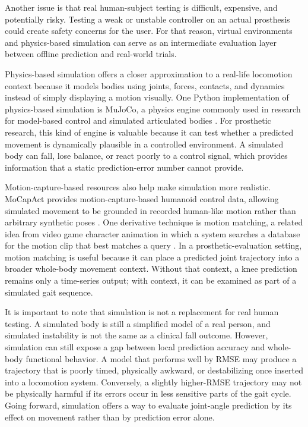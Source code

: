 \documentclass[referee,lineno,pdflatex,sn-vancouver-num]{sn-jnl}
\begin{document}
Another issue is that real human-subject testing is difficult, expensive, and potentially risky. Testing a weak or unstable controller on an actual prosthesis could create safety concerns for the user. For that reason, virtual environments and physics-based simulation can serve as an intermediate evaluation layer between offline prediction and real-world trials.

Physics-based simulation offers a closer approximation to a real-life locomotion context because it models bodies using joints, forces, contacts, and dynamics instead of simply displaying a motion visually. One Python implementation of physics-based simulation is MuJoCo, a physics engine commonly used in research for model-based control and simulated articulated bodies \cite{todorov2012}. For prosthetic research, this kind of engine is valuable because it can test whether a predicted movement is dynamically plausible in a controlled environment. A simulated body can fall, lose balance, or react poorly to a control signal, which provides information that a static prediction-error number cannot provide.

Motion-capture-based resources also help make simulation more realistic. MoCapAct provides motion-capture-based humanoid control data, allowing simulated movement to be grounded in recorded human-like motion rather than arbitrary synthetic poses \cite{wagener2022}. One derivative technique is motion matching, a related idea from video game character animation in which a system searches a database for the motion clip that best matches a query \cite{clavet2016}. In a prosthetic-evaluation setting, motion matching is useful because it can place a predicted joint trajectory into a broader whole-body movement context. Without that context, a knee prediction remains only a time-series output; with context, it can be examined as part of a simulated gait sequence.

It is important to note that simulation is not a replacement for real human testing. A simulated body is still a simplified model of a real person, and simulated instability is not the same as a clinical fall outcome. However, simulation can still expose a gap between local prediction accuracy and whole-body functional behavior. A model that performs well by RMSE may produce a trajectory that is poorly timed, physically awkward, or destabilizing once inserted into a locomotion system. Conversely, a slightly higher-RMSE trajectory may not be physically harmful if its errors occur in less sensitive parts of the gait cycle. Going forward, simulation offers a way to evaluate joint-angle prediction by its effect on movement rather than by prediction error alone.
\end{document}
